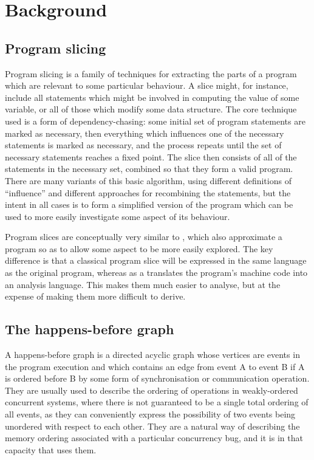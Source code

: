 \section{Background}


\subsection{Program slicing}

Program slicing\cite{Weiser1981} is a family of techniques for
extracting the parts of a program which are relevant to some
particular behaviour.  A slice might, for instance, include all
statements which might be involved in computing the value of some
variable, or all of those which modify some data structure.  The core
technique used is a form of dependency-chasing: some initial set of
program statements are marked as necessary, then everything which
influences one of the necessary statements is marked as necessary, and
the process repeats until the set of necessary statements reaches a
fixed point.  The slice then consists of all of the statements in the
necessary set, combined so that they form a valid program.  There are
many variants of this basic algorithm, using different definitions of
``influence'' and different approaches for recombining the statements,
but the intent in all cases is to form a simplified version of the
program which can be used to more easily investigate some aspect of
its behaviour.

Program slices are conceptually very similar to {\StateMachines},
which also approximate a program so as to allow some aspect to be more
easily explored.  The key difference is that a classical program slice
will be expressed in the same language as the original program,
whereas as a {\StateMachine} translates the program's machine code
into an analysis language.  This makes them much easier to analyse,
but at the expense of making them more difficult to derive.

\subsection{The happens-before graph}

A happens-before graph\needCite{} is a directed acyclic graph whose
vertices are events in the program execution and which contains an
edge from event A to event B if A is ordered before B by some form of
synchronisation or communication operation.  They are usually used to
describe the ordering of operations in weakly-ordered concurrent
systems, where there is not guaranteed to be a single total ordering
of all events, as they can conveniently express the possibility of two
events being unordered with respect to each other.  They are a natural
way of describing the memory ordering associated with a particular
concurrency bug, and it is in that capacity that {\technique} uses
them.

